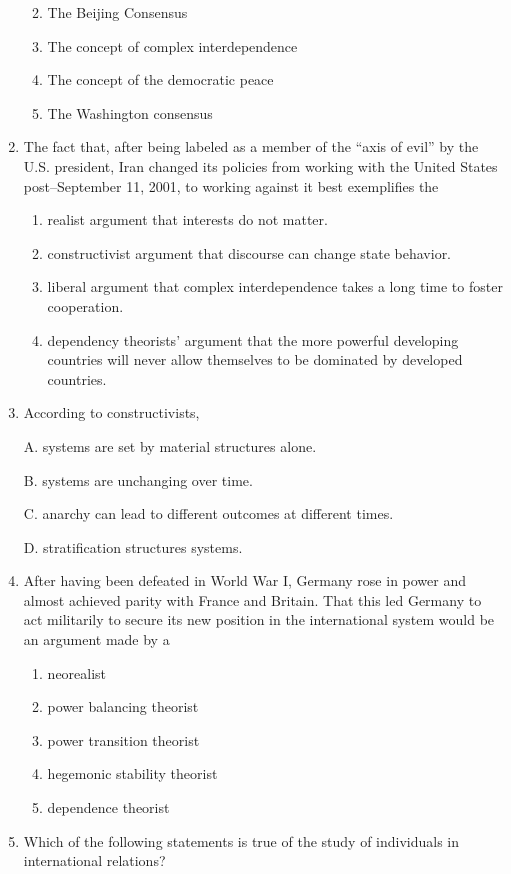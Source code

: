 \documentclass[
]{book}
\begin{document}
\begin{enumerate}
  \begin{enumerate}
  \def\labelenumii{\Alph{enumii}.}
  \item
    The Beijing Consensus
  \item
    The concept of complex interdependence
  \item
    The concept of the democratic peace
  \item
    The Washington consensus
  \end{enumerate}
\item
  The fact that, after being labeled as a member of the ``axis of evil'' by the U.S. president, Iran changed its policies from working with the United States post--September 11, 2001, to working against it best exemplifies the

  \begin{enumerate}
  \def\labelenumii{\Alph{enumii}.}
  \item
    realist argument that interests do not matter.
  \item
    constructivist argument that discourse can change state behavior.
  \item
    liberal argument that complex interdependence takes a long time to foster cooperation.
  \item
    dependency theorists' argument that the more powerful developing countries will never allow themselves to be dominated by developed countries.
  \end{enumerate}
\item
  According to constructivists,

  A. systems are set by material structures alone.

  B. systems are unchanging over time.

  C. anarchy can lead to different outcomes at different times.

  D. stratification structures systems.
\item
  After having been defeated in World War I, Germany rose in power and almost achieved parity with France and Britain. That this led Germany to act militarily to secure its new position in the international system would be an argument made by a

  \begin{enumerate}
  \def\labelenumii{\Alph{enumii}.}
  \item
    neorealist
  \item
    power balancing theorist
  \item
    power transition theorist
  \item
    hegemonic stability theorist
  \item
    dependence theorist
  \end{enumerate}
\item
  Which of the following statements is true of the study of individuals in international relations?


\end{enumerate}
\end{document}
